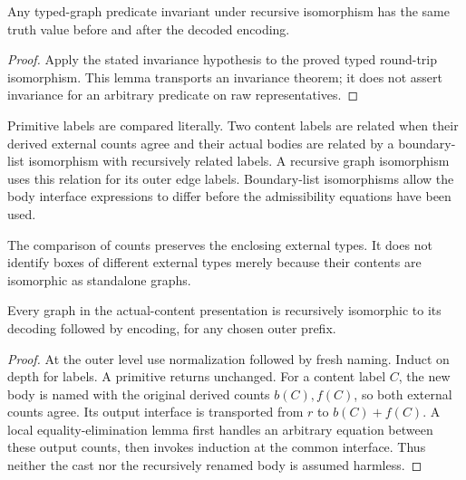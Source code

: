 \begin{lemma}
Any typed-graph predicate invariant under recursive isomorphism has the same
truth value before and after the decoded encoding.
\end{lemma}
\begin{proof}
Apply the stated invariance hypothesis to the proved typed round-trip
isomorphism. This lemma transports an invariance theorem; it does not assert
invariance for an arbitrary predicate on raw representatives.
\end{proof}

\begin{definition}
Primitive labels are compared literally. Two content labels are related when
their derived external counts agree and their actual bodies are related by a
boundary-list isomorphism with recursively related labels. A recursive graph
isomorphism uses this relation for its outer edge labels. Boundary-list
isomorphisms allow the body interface expressions to differ before the
admissibility equations have been used.
\end{definition}
The comparison of counts preserves the enclosing external types. It does not
identify boxes of different external types merely because their contents are
isomorphic as standalone graphs.


\begin{theorem}
Every graph in the actual-content presentation is recursively isomorphic to
its decoding followed by encoding, for any chosen outer prefix.
\end{theorem}
\begin{proof}
At the outer level use normalization followed by fresh naming. Induct on depth
for labels. A primitive returns unchanged. For a content label $C$, the new
body is named with the original derived counts $b(C),f(C)$, so both external
counts agree. Its output interface is transported from $r$ to $b(C)+f(C)$.
A local equality-elimination lemma first handles an arbitrary equation between
these output counts, then invokes induction at the common interface. Thus
neither the cast nor the recursively renamed body is assumed harmless.
\end{proof}

